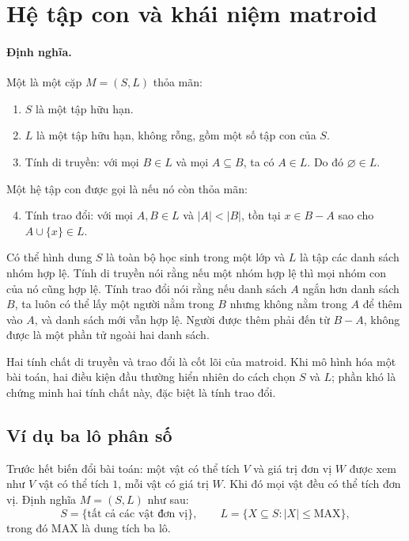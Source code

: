 \documentclass[11pt]{article}
\begin{document}
\section{Hệ tập con và khái niệm matroid}

\paragraph{Định nghĩa.}
Một  là một cặp \(M=(S,L)\) thỏa mãn:
\begin{enumerate}
  \item \(S\) là một tập hữu hạn.
  \item \(L\) là một tập hữu hạn, không rỗng, gồm một số tập con của \(S\).
  \item Tính di truyền: với mọi \(B\in L\) và mọi \(A\subseteq B\), ta có
        \(A\in L\). Do đó \(\varnothing\in L\).
\end{enumerate}
Một hệ tập con được gọi là  nếu nó còn thỏa mãn:
\begin{enumerate}
  \setcounter{enumi}{3}
  \item Tính trao đổi: với mọi \(A,B\in L\) và \(|A|<|B|\), tồn tại
        \(x\in B-A\) sao cho \(A\cup\{x\}\in L\).
\end{enumerate}

Có thể hình dung \(S\) là toàn bộ học sinh trong một lớp và \(L\) là tập các
danh sách nhóm hợp lệ. Tính di truyền nói rằng nếu một nhóm hợp lệ thì mọi
nhóm con của nó cũng hợp lệ. Tính trao đổi nói rằng nếu danh sách \(A\) ngắn
hơn danh sách \(B\), ta luôn có thể lấy một người nằm trong \(B\) nhưng không
nằm trong \(A\) để thêm vào \(A\), và danh sách mới vẫn hợp lệ. Người được thêm
phải đến từ \(B-A\), không được là một phần tử ngoài hai danh sách.

Hai tính chất di truyền và trao đổi là cốt lõi của matroid. Khi mô hình hóa
một bài toán, hai điều kiện đầu thường hiển nhiên do cách chọn \(S\) và \(L\);
phần khó là chứng minh hai tính chất này, đặc biệt là tính trao đổi.

\subsection*{Ví dụ ba lô phân số}

Trước hết biến đổi bài toán: một vật có thể tích \(V\) và giá trị đơn vị \(W\)
được xem như \(V\) vật có thể tích \(1\), mỗi vật có giá trị \(W\). Khi đó mọi
vật đều có thể tích đơn vị. Định nghĩa \(M=(S,L)\) như sau:
\[
  S=\{\text{tất cả các vật đơn vị}\},\qquad
  L=\{X\subseteq S: |X|\le \mathrm{MAX}\},
\]
trong đó \(\mathrm{MAX}\) là dung tích ba lô.
\end{document}
